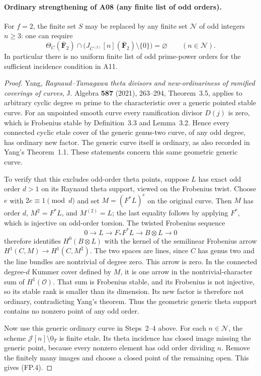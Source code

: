 \paragraph{Ordinary strengthening of A08 (any finite list of odd orders).}
For $f=2$, the finite set $S$ may be replaced by any finite set
$\mathcal N$ of odd integers $n\ge3$: one can require
\[
 \Theta_C(\overline{\mathbf F}_2)\cap
 \bigl(J_{C^{(2)}}[n](\overline{\mathbf F}_2)\setminus\{0\}\bigr)
 =\varnothing\qquad(n\in\mathcal N).
 \tag{FP.4}
\]
In particular there is no uniform finite list of odd prime-power
orders for the sufficient incidence condition in A11.

\begin{proof}
Yang, \emph{Raynaud--Tamagawa theta divisors and new-ordinariness of
ramified coverings of curves}, J. Algebra \textbf{587} (2021),
263--294, Theorem~3.5, applies to arbitrary cyclic degree $m$
prime to the characteristic over a generic pointed stable curve.
For an unpointed smooth curve every ramification divisor $D(j)$
is zero, which is Frobenius stable by Definition~3.3 and
Lemma~3.2.  Hence every connected cyclic etale cover of the
generic genus-two curve, of any odd degree, has ordinary new
factor.  The generic curve itself is ordinary, as also recorded
in Yang's Theorem~1.1.  These statements concern this same
geometric generic curve.

To verify that this excludes odd-order theta points, suppose $L$
has exact odd order $d>1$ on its Raynaud theta support, viewed on
the Frobenius twist.  Choose $e$ with $2e\equiv1\pmod d$ and set
$M=(F^*L)^e$ on the original curve.  Then $M$ has order $d$,
$M^2=F^*L$, and $M^{(2)}=L$; the last equality follows by applying
$F^*$, which is injective on odd-order torsion.
The twisted Frobenius sequence
\[
 0\longrightarrow L\longrightarrow F_*F^*L
 \longrightarrow B\otimes L\longrightarrow0
\]
therefore identifies $H^0(B\otimes L)$ with the kernel of the
semilinear Frobenius arrow
$H^1(C,M)\to H^1(C,M^2)$.
The two spaces are lines, since $C$ has genus two and the line
bundles are nontrivial of degree zero.  This arrow is zero.
In the connected degree-$d$ Kummer cover defined by $M$, it is
one arrow in the nontrivial-character sum of $H^1(\mathcal O)$.
That sum is Frobenius stable, and its Frobenius is not injective,
so its stable rank is smaller than its dimension.  Its new
factor is therefore not ordinary, contradicting Yang's theorem.
Thus the geometric generic theta support contains no nonzero
point of any odd order.

Now use this generic ordinary curve in Steps~2--4 above.  For each
$n\in\mathcal N$, the scheme $\mathcal J[n]\setminus0_T$ is finite
etale.  Its theta incidence has closed image missing the generic
point, because every nonzero element has odd order dividing $n$.
Remove the finitely many images and choose a closed point of the
remaining open.  This gives (FP.4).
\end{proof}

